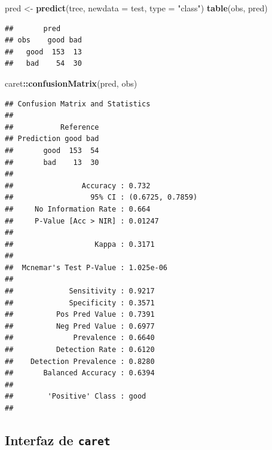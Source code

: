 \documentclass[
]{book}
\newenvironment{Shaded}{\begin{snugshade}}{\end{snugshade}}
\newcommand{\DataTypeTok}[1]{\textcolor[rgb]{0.13,0.29,0.53}{#1}}
\newcommand{\KeywordTok}[1]{\textcolor[rgb]{0.13,0.29,0.53}{\textbf{#1}}}
\newcommand{\NormalTok}[1]{#1}
\newcommand{\OperatorTok}[1]{\textcolor[rgb]{0.81,0.36,0.00}{\textbf{#1}}}
\newcommand{\StringTok}[1]{\textcolor[rgb]{0.31,0.60,0.02}{#1}}
\theoremstyle{break}
\theoremstyle{definition}
\theoremstyle{definition}
\theoremstyle{definition}
\theoremstyle{remark}
\begin{document}
\begin{Shaded}
\begin{Highlighting}[]
\NormalTok{pred <-}\StringTok{ }\KeywordTok{predict}\NormalTok{(tree, }\DataTypeTok{newdata =}\NormalTok{ test, }\DataTypeTok{type =} \StringTok{"class"}\NormalTok{)}
\KeywordTok{table}\NormalTok{(obs, pred)}
\end{Highlighting}
\end{Shaded}

\begin{verbatim}
##       pred
## obs    good bad
##   good  153  13
##   bad    54  30
\end{verbatim}

\begin{Shaded}
\begin{Highlighting}[]
\NormalTok{caret}\OperatorTok{::}\KeywordTok{confusionMatrix}\NormalTok{(pred, obs)}
\end{Highlighting}
\end{Shaded}

\begin{verbatim}
## Confusion Matrix and Statistics
## 
##           Reference
## Prediction good bad
##       good  153  54
##       bad    13  30
##                                           
##                Accuracy : 0.732           
##                  95% CI : (0.6725, 0.7859)
##     No Information Rate : 0.664           
##     P-Value [Acc > NIR] : 0.01247         
##                                           
##                   Kappa : 0.3171          
##                                           
##  Mcnemar's Test P-Value : 1.025e-06       
##                                           
##             Sensitivity : 0.9217          
##             Specificity : 0.3571          
##          Pos Pred Value : 0.7391          
##          Neg Pred Value : 0.6977          
##              Prevalence : 0.6640          
##          Detection Rate : 0.6120          
##    Detection Prevalence : 0.8280          
##       Balanced Accuracy : 0.6394          
##                                           
##        'Positive' Class : good            
## 
\end{verbatim}

\hypertarget{interfaz-de-caret}{%
\subsection{\texorpdfstring{Interfaz de \texttt{caret}}{Interfaz de caret}}\label{interfaz-de-caret}}
\end{document}
